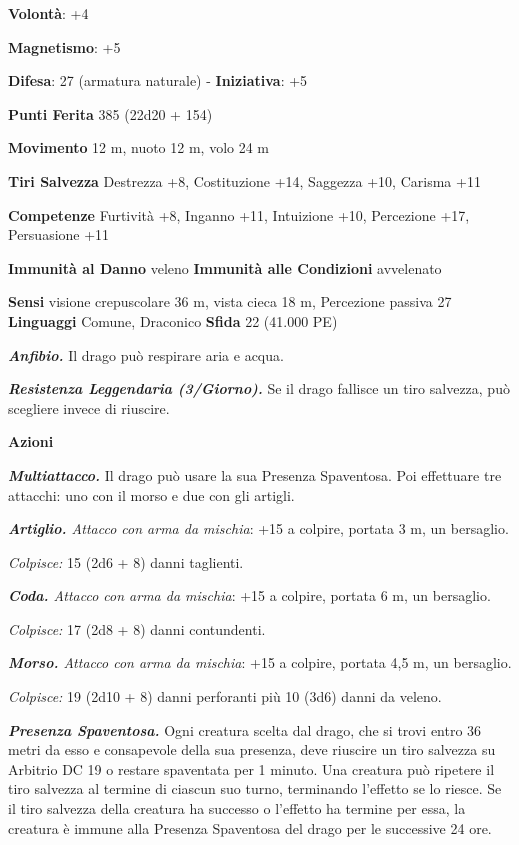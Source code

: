\begin{multicols}{2}
\textbf{Volontà}: +4

\textbf{Magnetismo}: +5

\textbf{Difesa}: 27 (armatura naturale) - \textbf{Iniziativa}: +5

\textbf{Punti Ferita} 385 (22d20 + 154)

\textbf{Movimento} 12 m, nuoto 12 m, volo 24 m

\textbf{Tiri Salvezza} Destrezza +8, Costituzione +14, Saggezza +10,
Carisma +11

\textbf{Competenze} Furtività +8, Inganno +11, Intuizione +10, Percezione
+17, Persuasione +11

\textbf{Immunità al Danno} veleno \textbf{Immunità alle Condizioni}
avvelenato

\textbf{Sensi} visione crepuscolare 36 m, vista cieca 18 m, Percezione passiva
27 \textbf{Linguaggi} Comune, Draconico \textbf{Sfida} 22 (41.000 PE)\smallskip

\emph{\textbf{Anfibio.}} Il drago può respirare aria e acqua.

\emph{\textbf{Resistenza Leggendaria (3/Giorno).}} Se il drago fallisce
un tiro salvezza, può scegliere invece di riuscire.

\smallskip\textbf{Azioni}

\emph{\textbf{Multiattacco.}} Il drago può usare la sua Presenza
Spaventosa. Poi effettuare tre attacchi: uno con il morso e due con gli
artigli.

\emph{\textbf{Artiglio.} Attacco con arma da mischia}: +15 a colpire,
portata 3 m, un bersaglio.

\emph{Colpisce:} 15 (2d6 + 8) danni taglienti.

\emph{\textbf{Coda.} Attacco con arma da mischia}: +15 a colpire,
portata 6 m, un bersaglio.

\emph{Colpisce:} 17 (2d8 + 8) danni contundenti.

\emph{\textbf{Morso.} Attacco con arma da mischia}: +15 a colpire,
portata 4,5 m, un bersaglio.

\emph{Colpisce:} 19 (2d10 + 8) danni perforanti più 10 (3d6) danni da
veleno.

\emph{\textbf{Presenza Spaventosa.}} Ogni creatura scelta dal drago, che
si trovi entro 36 metri da esso e consapevole della sua presenza, deve
riuscire un tiro salvezza su Arbitrio DC 19 o restare spaventata per 1
minuto. Una creatura può ripetere il tiro salvezza al termine di ciascun
suo turno, terminando l'effetto se lo riesce. Se il tiro salvezza della
creatura ha successo o l'effetto ha termine per essa, la creatura è
immune alla Presenza Spaventosa del drago per le successive 24 ore.


\end{multicols}
